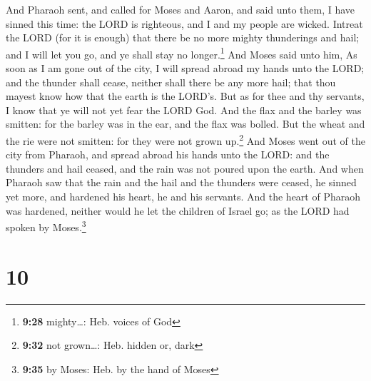  And Pharaoh sent, and called for Moses and Aaron, and
said unto them, I have sinned this time: the LORD is righteous, and I
and my people are wicked.  Intreat the LORD (for it is
enough) that there be no more mighty thunderings and hail; and I will
let you go, and ye shall stay no longer.\footnote{\textbf{9:28}
  mighty\ldots: Heb. voices of God}  And Moses said unto
him, As soon as I am gone out of the city, I will spread abroad my hands
unto the LORD; and the thunder shall cease, neither shall there be any
more hail; that thou mayest know how that the earth is the LORD's.
 But as for thee and thy servants, I know that ye will
not yet fear the LORD God.  And the flax and the barley
was smitten: for the barley was in the ear, and the flax was bolled.
 But the wheat and the rie were not smitten: for they
were not grown up.\footnote{\textbf{9:32} not grown\ldots: Heb. hidden
  or, dark}  And Moses went out of the city from Pharaoh,
and spread abroad his hands unto the LORD: and the thunders and hail
ceased, and the rain was not poured upon the earth.  And
when Pharaoh saw that the rain and the hail and the thunders were
ceased, he sinned yet more, and hardened his heart, he and his servants.
 And the heart of Pharaoh was hardened, neither would he
let the children of Israel go; as the LORD had spoken by
Moses.\footnote{\textbf{9:35} by Moses: Heb. by the hand of Moses}

\hypertarget{section-9}{%
\section{10}\label{section-9}}

